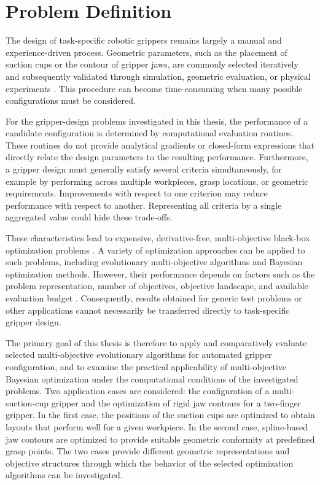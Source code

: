 \section{Problem Definition}
\label{sec:goals_tasks}

The design of task-specific robotic grippers remains largely a manual and experience-driven process. Geometric parameters, such as the placement of
suction cups or the contour of gripper jaws, are commonly selected iteratively and subsequently validated through simulation, geometric evaluation,
or physical experiments \cite{Liu2022Simulation}. This procedure can become time-consuming when many possible configurations must be considered.

For the gripper-design problems investigated in this thesis, the performance of a candidate configuration is determined by computational evaluation
routines. These routines do not provide analytical gradients or closed-form expressions that directly relate the design parameters to the resulting
performance. Furthermore, a gripper design must generally satisfy several criteria simultaneously, for example by performing across multiple
workpieces, grasp locations, or geometric requirements. Improvements with respect to one criterion may reduce performance with respect to another.
Representing all criteria by a single aggregated value could hide these trade-offs.

These characteristics lead to expensive, derivative-free, multi-objective black-box optimization problems \cite{Mueller2017SOCEMO}. A variety of
optimization approaches can be applied to such problems, including evolutionary multi-objective algorithms and Bayesian optimization methods.
However, their performance depends on factors such as the problem representation, number of objectives, objective landscape, and available
evaluation budget \cite{Santoni2023Comparison,Raponi2023Optimizing}. Consequently, results obtained for generic test problems or other applications
cannot necessarily be transferred directly to task-specific gripper design.

The primary goal of this thesis is therefore to apply and comparatively evaluate
selected multi-objective evolutionary algorithms for automated gripper
configuration, and to examine the practical applicability of multi-objective
Bayesian optimization under the computational conditions of the investigated
problems. Two application cases are considered: the
configuration of a multi-suction-cup gripper and the optimization of rigid jaw contours for a two-finger gripper. In the first case, the positions of
the suction cups are optimized to obtain layouts that perform well for a given workpiece. In the second case, spline-based jaw contours are
optimized to provide suitable geometric conformity at predefined grasp points. The two cases provide different geometric representations and
objective structures through which the behavior of the selected optimization algorithms can be investigated.

